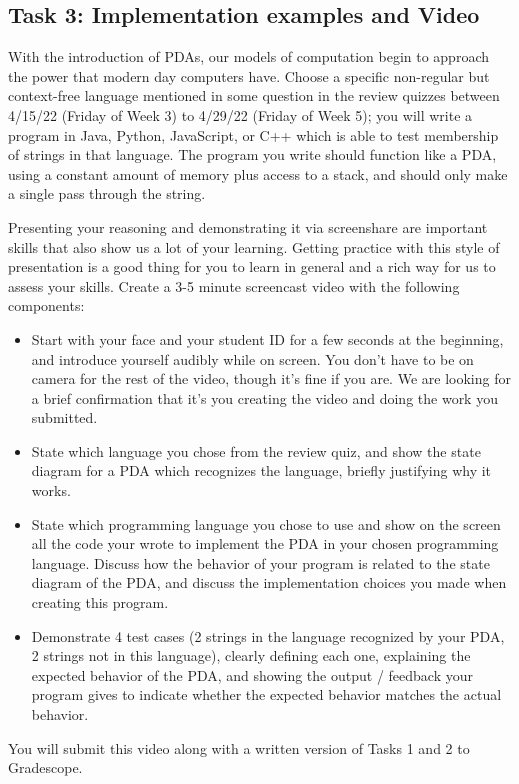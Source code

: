 \documentclass[12pt, oneside]{article}
\begin{document}
\subsection{Task 3: Implementation examples and Video}
 With the introduction of PDAs, our models of computation begin to approach the power that 
 modern day computers have. 
 Choose a specific non-regular but context-free language mentioned in some question 
 in the review quizzes between 4/15/22 (Friday of Week 3) 
 to 4/29/22 (Friday of Week 5); you will write a program in Java, Python, JavaScript, or C++
 which is able to test membership of strings in 
 that language.
 The program you write should function like a PDA, using a constant amount of memory plus 
 access to a stack, 
 and should only make a single pass through the string.
	

 Presenting your reasoning and demonstrating it via screenshare are important skills that 
 also show us a lot of your learning. Getting practice with this style of presentation is a 
 good thing for you to learn in general and a rich way for us to assess your skills. Create 
 a 3-5 minute screencast video with the following components:
 \begin{itemize}
	\item Start with your face and your student ID for a few seconds at the beginning, and introduce yourself audibly while on screen. 
	You don't have to be on camera for the rest of the video, though it's fine if you are. 
	We are looking for a brief confirmation that it's you creating the video and 
	doing the work you submitted.
	\item State which language you chose from the review quiz, and show the state diagram for 
	a PDA which recognizes the language, briefly justifying why it works.
	\item State which programming language you chose to use and show on the 
	screen all the code your wrote to implement the PDA in your chosen programming language.
	Discuss how the behavior of your program is related to the state diagram of the PDA, 
	and discuss the implementation choices you made when creating this program.
	\item Demonstrate 4 test cases (2 strings in the language recognized by your PDA, 
	2 strings not in this language), clearly defining each one, 
	explaining the expected behavior of the PDA, and 
	showing the output / feedback your program gives to indicate whether the expected behavior 
	matches the actual behavior.
\end{itemize}
You will submit this video along with a written version of Tasks 1 and 2 to Gradescope.
\end{document}

